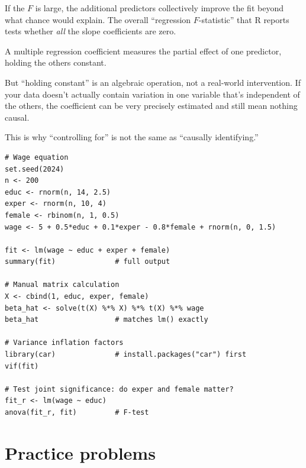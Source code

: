 If the $F$ is large, the additional predictors collectively improve the fit beyond what chance would explain. The overall ``regression $F$-statistic'' that R reports tests whether \emph{all} the slope coefficients are zero.

\begin{keyinsight}
A multiple regression coefficient measures the partial effect of one predictor, holding the others constant.

But ``holding constant'' is an algebraic operation, not a real-world intervention. If your data doesn't actually contain variation in one variable that's independent of the others, the coefficient can be very precisely estimated and still mean nothing causal.

This is why ``controlling for'' is not the same as ``causally identifying.''
\end{keyinsight}

\begin{codelab}
\begin{lstlisting}[language=Rlang]
# Wage equation
set.seed(2024)
n <- 200
educ <- rnorm(n, 14, 2.5)
exper <- rnorm(n, 10, 4)
female <- rbinom(n, 1, 0.5)
wage <- 5 + 0.5*educ + 0.1*exper - 0.8*female + rnorm(n, 0, 1.5)

fit <- lm(wage ~ educ + exper + female)
summary(fit)              # full output

# Manual matrix calculation
X <- cbind(1, educ, exper, female)
beta_hat <- solve(t(X) %*% X) %*% t(X) %*% wage
beta_hat                  # matches lm() exactly

# Variance inflation factors
library(car)              # install.packages("car") first
vif(fit)

# Test joint significance: do exper and female matter?
fit_r <- lm(wage ~ educ)
anova(fit_r, fit)         # F-test
\end{lstlisting}
\end{codelab}

\section{Practice problems}

